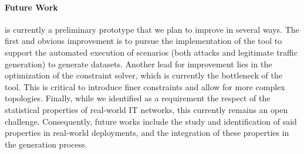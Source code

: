 \paragraph{Future Work}
\thecontrib is currently a preliminary prototype that we plan to improve in several ways.
The first and obvious improvement is to pursue the implementation of the tool to support the automated execution of scenarios (both attacks and legitimate traffic generation) to generate datasets.
Another lead for improvement lies in the optimization of the constraint solver, which is currently the bottleneck of the tool.
This is critical to introduce finer constraints and allow for more complex topologies.
Finally, while we identified as a requirement the respect of the statistical properties of real-world IT networks, this currently remains an open challenge.
Consequently, future works include the study and identification of said properties in real-world deployments, and the integration of these properties in the generation process.